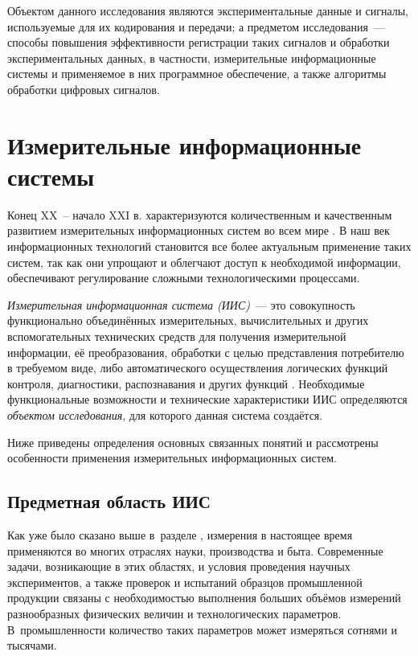 \documentclass[a4paper, 14pt, titlepage]{extarticle}
\newcommand{\term}[1]{\emph{#1}}
\let\oldsection\section
\renewcommand{\section}{\newpage\oldsection}
\begin{document}
  Объектом данного исследования являются экспериментальные данные и сигналы, используемые для их
  кодирования и передачи; а предметом исследования~--- способы повышения эффективности регистрации
  таких сигналов и обработки экспериментальных данных, в частности, измерительные информационные
  системы и применяемое в них программное обеспечение, а также алгоритмы обработки цифровых сигналов.

  \section{Измерительные информационные системы}\label{sec:iis}

  Конец XX~-- начало XXI в. характеризуются количественным и качественным развитием измерительных
  информационных систем во всем мире \cite[с.~3]{rannev-iis}. В наш век информационных
  технологий становится все более актуальным применение таких систем, так как они упрощают и облегчают доступ
  к необходимой информации, обеспечивают регулирование сложными технологическими процессами.

  \term{Измерительная информационная система (ИИС)}~--- это совокупность функционально объединённых
  измерительных, вычислительных и других вспомогательных технических средств для получения
  измерительной информации, её преобразования, обработки с целью представления потребителю в
  требуемом виде, либо автоматического осуществления логических функций контроля, диагностики,
  распознавания и других функций \cite[с.~9]{volkov-iis}.
  Необходимые функциональные возможности и технические характеристики ИИС определяются
  \term{объектом исследования}, для которого данная система создаётся.

  Ниже приведены определения основных связанных понятий и рассмотрены особенности применения
  измерительных информационных систем.

  \subsection{Предметная область ИИС}

  Как уже было сказано выше в~разделе , измерения в настоящее время применяются
  во многих отраслях науки, производства и быта. Современные задачи, возникающие в этих областях,
  и условия проведения научных экспериментов, а также проверок и испытаний образцов промышленной
  продукции связаны с необходимостью выполнения
  больших объёмов измерений разнообразных физических величин и технологических параметров.
  В~промышленности количество таких параметров может измеряться сотнями и тысячами.
\end{document}

